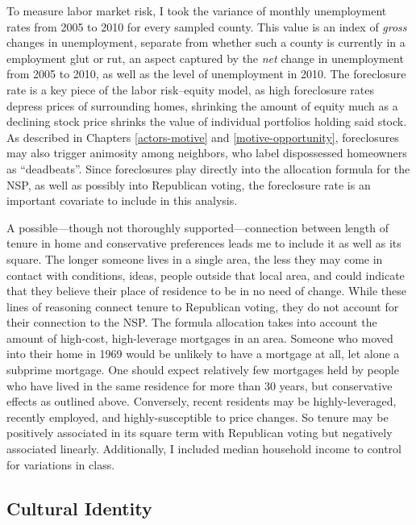 \documentclass[12pt,oneside]{psthesis}
\begin{document}
To measure labor market risk, I took the variance of monthly unemployment rates from 2005 to 2010 for every sampled county.
This value is an index of \emph{gross} changes in unemployment, separate from whether such a county is currently in a employment glut or rut, an aspect captured by the \emph{net} change in unemployment from 2005 to 2010, as well as the level of unemployment in 2010.
The foreclosure rate is a key piece of the labor risk--equity model, as high foreclosure rates depress prices of surrounding homes, shrinking the amount of equity much as a declining stock price shrinks the value of individual portfolios holding said stock.
As described in Chapters \ref{actors-motive} and \ref{motive-opportunity}, foreclosures may also trigger animosity among neighbors, who label dispossessed homeowners as ``deadbeats''.
Since foreclosures play directly into the allocation formula for the NSP, as well as possibly into Republican voting, the foreclosure rate is an important covariate to include in this analysis.

A possible---though not thoroughly supported---connection between length of tenure in home and conservative preferences leads me to include it as well as its square.
The longer someone lives in a single area, the less they may come in contact with conditions, ideas, people outside that local area, and could indicate that they believe their place of residence to be in no need of change.
While these lines of reasoning connect tenure to Republican voting, they do not account for their connection to the NSP.
The formula allocation takes into account the amount of high-cost, high-leverage mortgages in an area.
Someone who moved into their home in 1969 would be unlikely to have a mortgage at all, let alone a subprime mortgage.
One should expect relatively few mortgages held by people who have lived in the same residence for more than 30 years, but conservative effects as outlined above.
Conversely, recent residents may be highly-leveraged, recently employed, and highly-susceptible to price changes.
So tenure may be positively associated in its square term with Republican voting but negatively associated linearly.
Additionally, I included median household income to control for variations in class.

\hypertarget{cultural-identity}{%
\subsection{Cultural Identity}\label{cultural-identity}}
\end{document}
